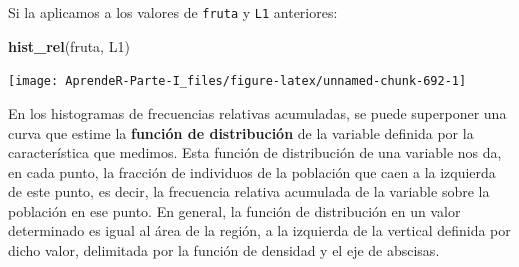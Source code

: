 \documentclass[]{book}
\newenvironment{Shaded}{\begin{snugshade}}{\end{snugshade}}
\newcommand{\ControlFlowTok}[1]{\textcolor[rgb]{0.13,0.29,0.53}{\textbf{#1}}}
\newcommand{\DataTypeTok}[1]{\textcolor[rgb]{0.13,0.29,0.53}{#1}}
\newcommand{\DecValTok}[1]{\textcolor[rgb]{0.00,0.00,0.81}{#1}}
\newcommand{\FloatTok}[1]{\textcolor[rgb]{0.00,0.00,0.81}{#1}}
\newcommand{\KeywordTok}[1]{\textcolor[rgb]{0.13,0.29,0.53}{\textbf{#1}}}
\newcommand{\NormalTok}[1]{#1}
\newcommand{\OperatorTok}[1]{\textcolor[rgb]{0.81,0.36,0.00}{\textbf{#1}}}
\newcommand{\OtherTok}[1]{\textcolor[rgb]{0.56,0.35,0.01}{#1}}
\newcommand{\StringTok}[1]{\textcolor[rgb]{0.31,0.60,0.02}{#1}}
\theoremstyle{definition}
\theoremstyle{definition}
\theoremstyle{definition}
\theoremstyle{remark}
\begin{document}
\begin{Shaded}
\end{Shaded}

Si la aplicamos a los valores de \texttt{fruta} y \texttt{L1} anteriores:

\begin{Shaded}
\begin{Highlighting}[]
\KeywordTok{hist_rel}\NormalTok{(fruta, L1)}
\end{Highlighting}
\end{Shaded}

\begin{center}\texttt{[image: AprendeR-Parte-I\_files/figure-latex/unnamed-chunk-692-1]} \end{center}

En los histogramas de frecuencias relativas acumuladas, se puede superponer una curva que estime la \textbf{función de distribución} de la variable definida por la característica que medimos. Esta función de distribución de una variable nos da, en cada punto, la fracción de individuos de la población que caen a la izquierda de este punto, es decir, la frecuencia relativa acumulada de la variable sobre la población en ese punto. En general, la función de distribución en un valor determinado es igual al área de la región, a la izquierda de la vertical definida por dicho valor, delimitada por la función de densidad y el eje de abscisas.
\end{document}
